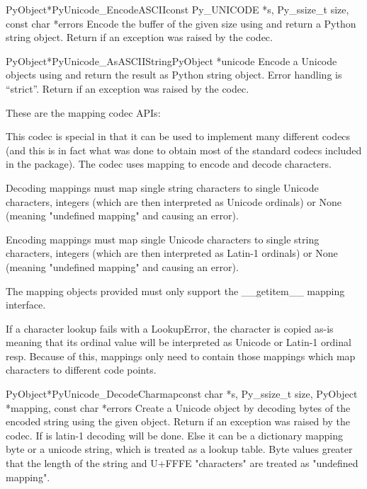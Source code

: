 \begin{cfuncdesc}{PyObject*}{PyUnicode_EncodeASCII}{const Py_UNICODE *s,
                                                    Py_ssize_t size,
                                                    const char *errors}
  Encode the  buffer of the given size using
  \ASCII{} and return a Python string object.  Return \NULL{} if an
  exception was raised by the codec.
\end{cfuncdesc}

\begin{cfuncdesc}{PyObject*}{PyUnicode_AsASCIIString}{PyObject *unicode}
  Encode a Unicode objects using \ASCII{} and return the result as
  Python string object.  Error handling is ``strict''.  Return
  \NULL{} if an exception was raised by the codec.
\end{cfuncdesc}


These are the mapping codec APIs:

This codec is special in that it can be used to implement many
different codecs (and this is in fact what was done to obtain most of
the standard codecs included in the  package). The
codec uses mapping to encode and decode characters.

Decoding mappings must map single string characters to single Unicode
characters, integers (which are then interpreted as Unicode ordinals)
or None (meaning "undefined mapping" and causing an error).

Encoding mappings must map single Unicode characters to single string
characters, integers (which are then interpreted as Latin-1 ordinals)
or None (meaning "undefined mapping" and causing an error).

The mapping objects provided must only support the __getitem__ mapping
interface.

If a character lookup fails with a LookupError, the character is
copied as-is meaning that its ordinal value will be interpreted as
Unicode or Latin-1 ordinal resp. Because of this, mappings only need
to contain those mappings which map characters to different code
points.

\begin{cfuncdesc}{PyObject*}{PyUnicode_DecodeCharmap}{const char *s,
                                               Py_ssize_t size,
                                               PyObject *mapping,
                                               const char *errors}
  Create a Unicode object by decoding  bytes of the encoded
  string  using the given  object.  Return
  \NULL{} if an exception was raised by the codec. If  is \NULL{}
  latin-1 decoding will be done. Else it can be a dictionary mapping byte or a
  unicode string, which is treated as a lookup table. Byte values greater
  that the length of the string and U+FFFE "characters" are treated as
  "undefined mapping".
\end{cfuncdesc}

